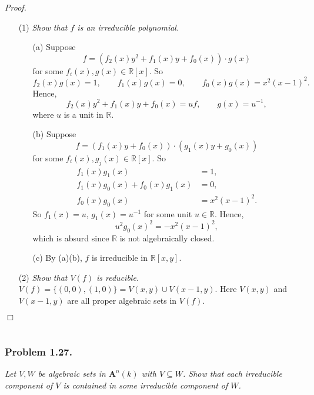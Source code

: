 \documentclass{article}
\begin{document}
\emph{Proof.}
\begin{enumerate}
\item[(1)]
  \emph{Show that $f$ is an irreducible polynomial.}
  \begin{enumerate}
  \item[(a)]
    Suppose
    \[
      f = (f_2(x) y^2 + f_1(x) y + f_0(x)) \cdot g(x)
    \]
    for some $f_i(x), g(x) \in \mathbb{R}[x]$.
    So
    \[
      f_2(x)g(x) = 1,
      \qquad
      f_1(x)g(x) = 0,
      \qquad
      f_0(x)g(x) = x^2(x-1)^2.
    \]
    Hence,
    \[
      f_2(x) y^2 + f_1(x) y + f_0(x) = uf,
      \qquad
      g(x) = u^{-1},
    \]
    where $u$ is a unit in $\mathbb{R}$.

  \item[(b)]
    Suppose
    \[
      f = (f_1(x) y + f_0(x)) \cdot (g_1(x) y + g_0(x))
    \]
    for some $f_i(x), g_j(x) \in \mathbb{R}[x]$.
    So
    \begin{align*}
      f_1(x)g_1(x) &= 1, \\
      f_1(x)g_0(x) + f_0(x)g_1(x) &= 0, \\
      f_0(x)g_0(x) &= x^2(x-1)^2.
    \end{align*}
    So $f_1(x) = u$, $g_1(x) = u^{-1}$ for some unit $u \in \mathbb{R}$.
    Hence,
    \[
      u^2 g_0(x)^2 = -x^2(x-1)^2,
    \]
    which is absurd since $\mathbb{R}$ is not algebraically closed.

  \item[(c)]
    By (a)(b), $f$ is irreducible in $\mathbb{R}[x,y]$.
  \end{enumerate}

\item[(2)]
  \emph{Show that $V(f)$ is reducible.}
  $V(f) = \{ (0,0), (1,0) \} = V(x,y) \cup V(x-1,y)$.
  Here $V(x,y)$ and $V(x-1,y)$ are all proper algebraic sets in $V(f)$.
\end{enumerate}
$\Box$ \\\\






\subsubsection*{Problem 1.27.}
\emph{Let $V, W$ be algebraic sets in $\mathbf{A}^n(k)$ with $V \subseteq W$.
Show that each irreducible component of $V$ is contained in some irreducible component of $W$.} \\
\end{document}
